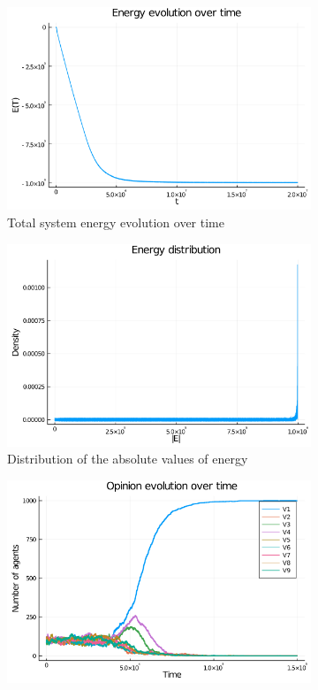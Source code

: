 \documentclass[12pt,openright,twoside]{book}
\begin{document}
\begin{appendices}
\begin{figure}
\centering
\begin{subfigure}[b]{0.65\linewidth}
    \includegraphics[width=\linewidth]{figures/pop1000/energy_evolution_1-2_10e7.png}
    \caption{Total system energy evolution over time}
\end{subfigure}
\begin{subfigure}[b]{0.65\linewidth}
    \includegraphics[width=\linewidth]{figures/pop1000/energy_distribution.png}
    \caption{Distribution of the absolute values of energy}
\end{subfigure}
\begin{subfigure}[b]{0.65\linewidth}
    \includegraphics[width=\linewidth]{figures/pop1000/opinion_evolution_1-15_10e4.png}

\end{subfigure}
\end{figure}
\end{appendices}
\end{document}
